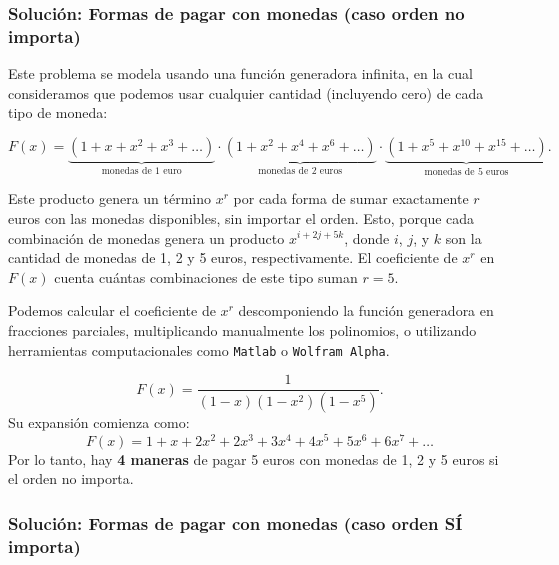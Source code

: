 \subsubsection*{Solución: Formas de pagar con monedas (caso orden no importa)}
Este problema se modela usando una función generadora infinita, en la cual consideramos que podemos usar cualquier cantidad (incluyendo cero) de cada tipo de moneda:

\[
F(x) = \underbrace{(1 + x + x^2 + x^3 + \dots)}_{\text{monedas de 1 euro}} 
\cdot \underbrace{(1 + x^2 + x^4 + x^6 + \dots)}_{\text{monedas de 2 euros}} 
\cdot \underbrace{(1 + x^5 + x^{10} + x^{15} + \dots)}_{\text{monedas de 5 euros}}.
\]

Este producto genera un término $x^r$ por cada forma de sumar exactamente $r$ euros con las monedas disponibles, sin importar el orden.
Esto, porque cada combinación de monedas genera un producto $x^{i + 2j + 5k}$, donde $i$, $j$, y $k$ son la cantidad de monedas de 1, 2 y 5 euros, respectivamente. El coeficiente de $x^r$ en $F(x)$ cuenta cuántas combinaciones de este tipo suman $r=5$.



Podemos calcular el coeficiente de \(x^r\) descomponiendo la función generadora en fracciones parciales, multiplicando manualmente los polinomios, o utilizando herramientas computacionales como \texttt{Matlab} o \texttt{Wolfram Alpha}.

\[
F(x) = \frac{1}{(1 - x)(1 - x^2)(1 - x^5)}.
\]
\noindent Su expansión comienza como:
\[
F(x) = 1 + x + 2x^2 + 2x^3 + 3x^4 + \boxed{4x^5} + 5x^6 + 6x^7 + \dots
\]
Por lo tanto, hay \textbf{4 maneras} de pagar 5 euros con monedas de 1, 2 y 5 euros si el orden no importa.



\subsubsection*{Solución: Formas de pagar con monedas (caso orden SÍ importa)}


